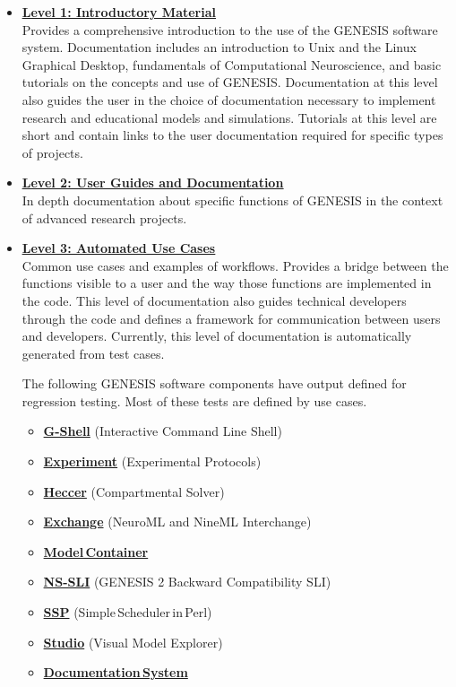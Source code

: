 \documentclass[12pt]{article}
\begin{document}
\begin{itemize}

\item[]\href{../contents-level1/contents-level1.tex}{\bf \underline{Level 1: Introductory Material}}\\
Provides a comprehensive
  introduction to the use of the GENESIS software system.
  Documentation includes an introduction to Unix and the Linux
  Graphical Desktop, fundamentals of Computational Neuroscience, and
  basic tutorials on the concepts and use of GENESIS. Documentation at
  this level also guides the user in the choice of documentation
  necessary to implement research and educational models and
  simulations.  Tutorials at this level are short and contain links to
  the user documentation required for specific types of projects.

\item[]\href{../contents-level2/contents-level2.tex}{\bf \underline{Level 2: User Guides and Documentation}}\\
 In depth
  documentation about specific functions of GENESIS in the context of
  advanced research projects.

\item[]\href{http://www.neurospaces.org/tests-menu.html}{\bf \underline{Level 3: Automated Use Cases}}\\
  Common use cases and examples
  of workflows. Provides a bridge between the functions visible to a user and
  the way those functions are implemented in the code.  This level of documentation also guides technical developers through the code and defines a
  framework for communication between users and developers.
  Currently, this level of documentation is automatically generated
  from test cases.
  
The following GENESIS software components have output defined for regression testing. Most of these tests are defined by use cases.
\begin{itemize}
\item[]\href{../tests-gshell/tests-gshell.tex}{\bf G-Shell} (Interactive Command Line Shell)
\item[]\href{../tests-experiment/tests-experiment.tex}{\bf Experiment} (Experimental Protocols)
\item[]\href{../tests-heccer/tests-heccer.tex}{\bf Heccer} (Compartmental Solver)
\item[]\href{../tests-exchange/tests-exchange.tex}{\bf Exchange} (NeuroML and NineML Interchange)
\item[]\href{../tests-model-container/tests-model-container.tex}{\bf  Model\,Container}
\item[]\href{../tests-g2-backward-compatibility/tests-g2-backward-compatibility.tex}{\bf NS-SLI} (GENESIS 2 Backward Compatibility SLI)
\item[]\href{../tests-ssp/tests-ssp.tex}{\bf SSP} {(Simple\,Scheduler\,in\,Perl)}
\item[]\href{../tests-studio/tests-studio.tex}{\bf Studio} (Visual Model Explorer)
\item[]\href{http://neurospaces.sourceforge.net/neurospaces_project/userdocs/tests/html/index.html}{\bf Documentation\,System}
\end{itemize}
  

\end{itemize}
\end{document}

